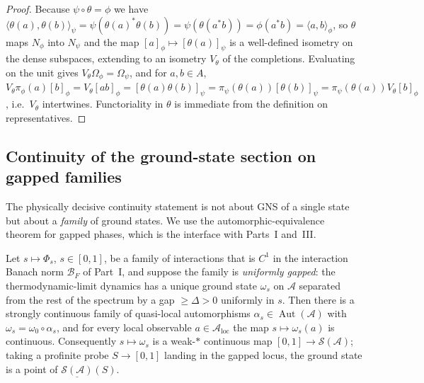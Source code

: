 \documentclass[12pt]{article}
\newcommand{\cond}[1]{\underline{#1}}          %
\newcommand{\BF}{\mathcal{B}_{F}}              %
\newcommand{\gapbound}{\Delta}                  %
\newcommand{\qla}{\mathcal{A}}                  %
\newcommand{\loc}{\mathrm{loc}}                 %
\newcommand{\St}{\mathcal{S}}                   %
\newcommand{\Rep}{\pi}                          %
\newcommand{\Aut}{\operatorname{Aut}}          %
\newcommand{\ip}[2]{\langle #1 , #2 \rangle}
\theoremstyle{plain}
\begin{document}
\begin{proof}
Because $\psi\circ\theta=\phi$ we have
$\ip{\theta(a)}{\theta(b)}_{\psi}=\psi(\theta(a)^{*}\theta(b))
=\psi(\theta(a^{*}b))=\phi(a^{*}b)=\ip{a}{b}_{\phi}$, so $\theta$ maps $N_{\phi}$
into $N_{\psi}$ and the map $[a]_{\phi}\mapsto[\theta(a)]_{\psi}$ is a well-defined
isometry on the dense subspaces, extending to an isometry $V_{\theta}$ of the
completions. Evaluating on the unit gives $V_{\theta}\Omega_{\phi}=\Omega_{\psi}$,
and for $a,b\in A$,
$V_{\theta}\Rep_{\phi}(a)[b]_{\phi}=V_{\theta}[ab]_{\phi}=[\theta(a)\theta(b)]_{\psi}
=\Rep_{\psi}(\theta(a))[\theta(b)]_{\psi}=\Rep_{\psi}(\theta(a))V_{\theta}[b]_{\phi}$,
i.e.\ $V_{\theta}$ intertwines. Functoriality in $\theta$ is immediate from the
definition on representatives.
\end{proof}

\subsection{Continuity of the ground-state section on gapped families}

The physically decisive continuity statement is not about GNS of a single state but
about a \emph{family} of ground states. We use the automorphic-equivalence theorem
for gapped phases, which is the interface with Parts~I and~III.

\begin{theorem}
\label{thm:groundstate}
Let $s\mapsto\Phi_{s}$, $s\in[0,1]$, be a family of interactions that is $C^{1}$ in
the interaction Banach norm $\BF$ of Part~I, and suppose the family is
\emph{uniformly gapped}: the thermodynamic-limit dynamics has a unique ground state
$\omega_{s}$ on $\qla$ separated from the rest of the spectrum by a gap
$\ge\gapbound>0$ uniformly in $s$. Then there is a strongly continuous family of
quasi-local automorphisms $\alpha_{s}\in\Aut(\qla)$ with
$\omega_{s}=\omega_{0}\circ\alpha_{s}$, and for every local observable
$a\in\qla_{\loc}$ the map $s\mapsto\omega_{s}(a)$ is continuous. Consequently
$s\mapsto\omega_{s}$ is a weak-$\ast$ continuous map $[0,1]\to\St(\qla)$; taking a
profinite probe $S\to[0,1]$ landing in the gapped locus, the ground state is a point
of $\cond{\St(\qla)}(S)$.
\end{theorem}
\end{document}
